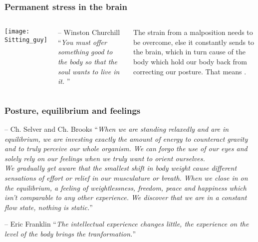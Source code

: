 \begin{frame}
\frametitle{Permanent stress in the brain}
\begin{columns}[c] %
\texttt{[image: Sitting\_guy]}
\begin{block}{-- Winston Churchill}
``\textit{You must offer something good to the body so that the soul wants to live in it. }''
\end{block}
The strain from a malposition needs to be overcome, else it constantly sends  to the brain, which in turn cause  of the body which hold our body back from correcting our posture. That means .
\end{columns}
\end{frame}
\begin{frame}
\frametitle{Posture, equilibrium and feelings}

\begin{block}{-- Ch. Selver and Ch. Brooks}
``\textit{When we are standing relaxedly and are in equilibrium, we are investing exactly the amount of energy to counteract gravity and to truly perceive our whole organism. We can forgo the use of our eyes and solely rely on our feelings when we truly want to orient ourselves.\\
We gradually get aware that the smallest shift in body weight cause different sensations of effort or relief in our musculature or breath. When we close in on the equilibrium, a feeling of weightlessness, freedom, peace and happiness which isn't comparable to any other experience. We discover that we are in a constant flow state, nothing is static.}''
\end{block}


\begin{block}{-- Eric Franklin}
``\textit{The intellectual experience changes little, the experience on the level of the body brings the tranformation.}''
\end{block}
\end{frame}
